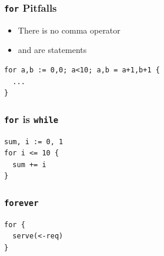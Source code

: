 \documentclass[xetex,mathserif,serif,12pt]{beamer}
\begin{document}
\begin{frame}[fragile]
  \frametitle{\texttt{for} Pitfalls}

  \begin{itemize}
  \item There is no comma operator
  \item \hltexttt{++} and \hltexttt{--} are statements
  \end{itemize}

  \begin{beamer@nomargin}
    \begin{lstlisting}
for a,b := 0,0; a<10; a,b = a+1,b+1 {
  ...
}
    \end{lstlisting}
  \end{beamer@nomargin}
\end{frame}

\begin{frame}[fragile]
  \frametitle{\texttt{for} is \texttt{while}}

  \begin{beamer@nomargin}
    \begin{lstlisting}
sum, i := 0, 1
for i <= 10 {
  sum += i
}
    \end{lstlisting}
  \end{beamer@nomargin}
\end{frame}

\begin{frame}[fragile]
  \frametitle{\texttt{forever}}

  \begin{beamer@nomargin}
    \begin{lstlisting}
for {
  serve(<-req)
}
    \end{lstlisting}
  \end{beamer@nomargin}
\end{frame}

\end{document}
